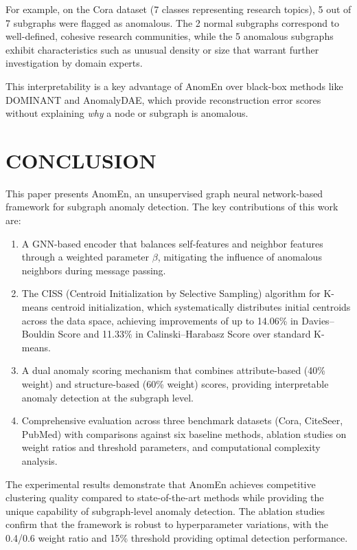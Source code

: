 \documentclass[10pt,twocolumn,a4paper]{article}
\begin{document}
For example, on the Cora dataset (7 classes representing research topics), 5 out of 7 subgraphs were flagged as anomalous. The 2 normal subgraphs correspond to well-defined, cohesive research communities, while the 5 anomalous subgraphs exhibit characteristics such as unusual density or size that warrant further investigation by domain experts.

This interpretability is a key advantage of AnomEn over black-box methods like DOMINANT and AnomalyDAE, which provide reconstruction error scores without explaining \textit{why} a node or subgraph is anomalous.

\section{CONCLUSION}

This paper presents AnomEn, an unsupervised graph neural network-based framework for subgraph anomaly detection. The key contributions of this work are:

\begin{enumerate}
    \item A GNN-based encoder that balances self-features and neighbor features through a weighted parameter $\beta$, mitigating the influence of anomalous neighbors during message passing.
    
    \item The CISS (Centroid Initialization by Selective Sampling) algorithm for K-means centroid initialization, which systematically distributes initial centroids across the data space, achieving improvements of up to 14.06\% in Davies--Bouldin Score and 11.33\% in Calinski--Harabasz Score over standard K-means.
    
    \item A dual anomaly scoring mechanism that combines attribute-based (40\% weight) and structure-based (60\% weight) scores, providing interpretable anomaly detection at the subgraph level.
    
    \item Comprehensive evaluation across three benchmark datasets (Cora, CiteSeer, PubMed) with comparisons against six baseline methods, ablation studies on weight ratios and threshold parameters, and computational complexity analysis.
\end{enumerate}

The experimental results demonstrate that AnomEn achieves competitive clustering quality compared to state-of-the-art methods while providing the unique capability of subgraph-level anomaly detection. The ablation studies confirm that the framework is robust to hyperparameter variations, with the 0.4/0.6 weight ratio and 15\% threshold providing optimal detection performance.
\end{document}
